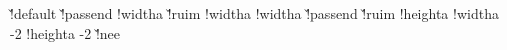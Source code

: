 {     \boxhasstrutfalse
     \boxisoverlaidtrue
     \@@localoffset\zeropoint
   \else
     \boxhasoffsettrue
     \boxhasstruttrue
     \boxisoverlaidfalse
     \ifx\localoffset\v!default %
       \let\localoffset\defaultframeoffset
     \else
       \let{}\localoffset
     \fi
     \@@localoffset\localoffset
     \advance\@@localoffset {}
   \fi\fi
   \ifx\localwidth\v!passend
     \ifboxhasformat
       \boxhaswidthtrue
       \!!widtha\hsize
     \else
       \boxhaswidthfalse
     \fi
   \else\ifx\localwidth\v!ruim
     \boxhaswidthtrue
     \!!widtha\hsize
   \else
     \boxhaswidthtrue
     \!!widtha\localwidth
   \fi\fi
   \ifx\localheight\v!passend
     \boxhasheightfalse %
   \else\ifx\localheight\v!ruim
     \boxhasheightfalse
   \else
     \boxhasheighttrue
     \!!heighta\localheight
   \fi\fi
   \ifdim\!!widtha=\hsize
     \parindent\zeropoint
     \setlocalhsize
     \!!widtha\localhsize
   \fi
   \advance\!!widtha  -2\@@localoffset
   \advance\!!heighta -2\@@localoffset
   \ifx\localstrut\v!nee
     \boxhasstrutfalse
   \fi
   \ifboxhasstrut
     \setstrut
     \let\localbegstrut\begstrut
     \let\localendstrut\endstrut
     \let\localstrut   \strut
   \else
     \let\localbegstrut\pseudobegstrut %
     \let\localendstrut\pseudoendstrut %
     \let\localstrut   \pseudostrut    %
   \fi
   \ifboxhasheight
     \let\\\vboxednewline
     \ifboxhaswidth
       \let\hairline\vboxedhairline
       \ifboxhasformat
         \let\next\doformatboxSomeFormat
       \else
         \let\next\doformatboxNoFormat
       \fi
     \else
       \let\hairline\hboxedhairline
       \ifboxhasformat
         \let\next\doformatboxHeight
       \else
         \let\next\doformatboxVSize
       \fi
     \fi
   \else
     \ifboxhaswidth
       \ifboxhasformat
         \let\hairline\vboxedhairline
         \let\\\vboxednewline
         \let\next\doformatboxWidth
       \else
         \let\hairline\hboxedhairline
         \let\\\hboxednewline
         \let\next\doformatboxHSize
       \fi
     \else
}
